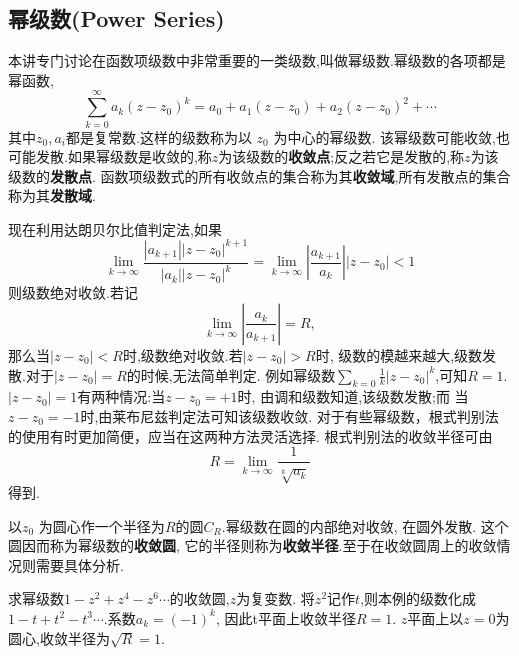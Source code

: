\subsection{幂级数(Power Series)}
本讲专门讨论在函数项级数中非常重要的一类级数,叫做幂级数.幂级数的各项都是幂函数,
\begin{equation}
    \sum_{k=0}^{\infty} a_k\left(z-z_0\right)^k=a_0+a_1\left(z-z_0\right)+a_2\left(z-z_0\right)^2+\cdots
\end{equation}
其中$z_0, a_i$都是复常数.这样的级数称为以 $z_0$ 为中心的幂级数.
该幂级数可能收敛,也可能发散.如果幂级数是收敛的,称$z$为该级数的\textbf{收敛点};反之若它是发散的,称$z$为该级数的\textbf{发散点}.
函数项级数式的所有收敛点的集合称为其\textbf{收敛域},所有发散点的集合称为其\textbf{发散域}.

现在利用达朗贝尔比值判定法,如果
\begin{equation}
    \lim _{k \rightarrow \infty} \frac{\left|a_{k+1}\right|\left|z-z_0\right|^{k+1}}{\left|a_k\right|\left|z-z_0\right|^k}
    =\lim _{k \rightarrow \infty}\left|\frac{a_{k+1}}{a_k}\right|\left|z-z_0\right|<1
\end{equation}
则级数绝对收敛.若记
\begin{equation}
    \lim_{k \rightarrow \infty} \left|\frac{a_{k}}{a_{k+1}}\right| = R,
\end{equation}
那么当$|z-z_0| < R$时,级数绝对收敛.若$|z-z_0| > R$时, 级数的模越来越大,级数发散.对于$|z-z_0| = R$的时候,无法简单判定.
例如幂级数$\sum_{k=0} \frac{1}{k} |z-z_0|^k$,可知$R=1$.$|z-z_0|=1$有两种情况:当$z-z_0 = +1$时, 由调和级数知道,该级数发散;而
当$z-z_0 = -1$时,由莱布尼兹判定法可知该级数收敛.
对于有些幂级数，根式判别法的使用有时更加简便，应当在这两种方法灵活选择.
根式判别法的收敛半径可由
\begin{equation}
    R = \lim_{k \rightarrow \infty} \frac{1}{\sqrt[k]{a_k}}
\end{equation}
得到.

以$z_0$ 为圆心作一个半径为$R$的圆$C_R$.幂级数在圆的内部绝对收敛, 在圆外发散. 这个圆因而称为幂级数的\textbf{收敛圆}, 
它的半径则称为\textbf{收敛半径}.至于在收敛圆周上的收敛情况则需要具体分析.

\begin{examplebox}{求幂级数$1 - z^2 + z^4 - z^6\cdots$的收敛圆,$z$为复变数.}
    将$z^2$记作$t$,则本例的级数化成$1-t + t^2 - t^3\cdots$.系数$a_k =(-1)^k$, 因此t平面上收敛半径$R=1$. 
    $z$平面上以$z=0$为圆心,收敛半径为$\sqrt{R}=1$.
\end{examplebox}

